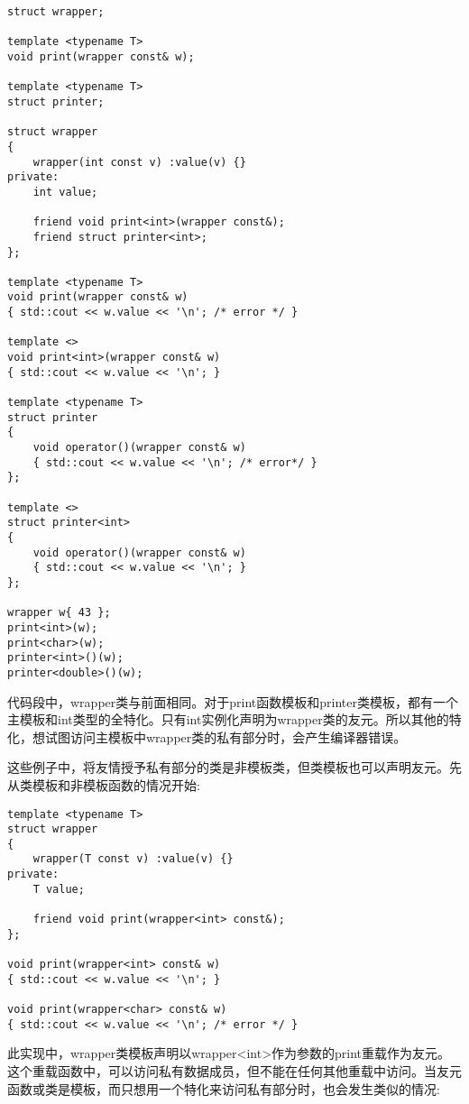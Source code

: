 \begin{lstlisting}[style=styleCXX]
struct wrapper;

template <typename T>
void print(wrapper const& w);

template <typename T>
struct printer;

struct wrapper
{
	wrapper(int const v) :value(v) {}
private:
	int value;
	
	friend void print<int>(wrapper const&);
	friend struct printer<int>;
};

template <typename T>
void print(wrapper const& w)
{ std::cout << w.value << '\n'; /* error */ }

template <>
void print<int>(wrapper const& w)
{ std::cout << w.value << '\n'; }

template <typename T>
struct printer
{
	void operator()(wrapper const& w)
	{ std::cout << w.value << '\n'; /* error*/ }
};

template <>
struct printer<int>
{
	void operator()(wrapper const& w)
	{ std::cout << w.value << '\n'; }
};

wrapper w{ 43 };
print<int>(w);
print<char>(w);
printer<int>()(w);
printer<double>()(w);
\end{lstlisting}

代码段中，wrapper类与前面相同。对于print函数模板和printer类模板，都有一个主模板和int类型的全特化。只有int实例化声明为wrapper类的友元。所以其他的特化，想试图访问主模板中wrapper类的私有部分时，会产生编译器错误。

这些例子中，将友情授予私有部分的类是非模板类，但类模板也可以声明友元。先从类模板和非模板函数的情况开始:

\begin{lstlisting}[style=styleCXX]
template <typename T>
struct wrapper
{
	wrapper(T const v) :value(v) {}
private:
	T value;
	
	friend void print(wrapper<int> const&);
};

void print(wrapper<int> const& w)
{ std::cout << w.value << '\n'; }

void print(wrapper<char> const& w)
{ std::cout << w.value << '\n'; /* error */ }
\end{lstlisting}

此实现中，wrapper类模板声明以wrapper<int>作为参数的print重载作为友元。这个重载函数中，可以访问私有数据成员，但不能在任何其他重载中访问。当友元函数或类是模板，而只想用一个特化来访问私有部分时，也会发生类似的情况:

